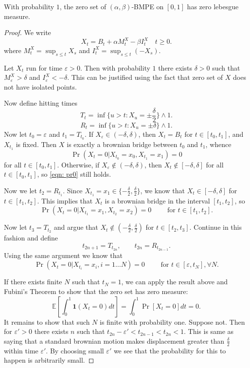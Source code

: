 \begin{proposition}
	With probability $1$, the zero set of $\left( \alpha, \beta \right) $-BMPE on $[0,1]$ has zero lebesgue measure.
\end{proposition}
\begin{proof}
	We write
	\[
		X_t=B_t+\alpha M_t^X-\beta I_t^X \quad t \geqslant 0
	.\] 
	where $M_t^X=\sup _{s \leqslant t} X_s$ and $I_t^X=\sup _{s \leqslant t}\left(-X_s\right)$. 

	Let  $X_t$ run for time  $\varepsilon>0$. Then with probability $1$ there exists $\delta>0$ such that $M_\varepsilon^X > \delta$ and $I_\varepsilon^X < - \delta$. This can be justified using the fact that zero set of $X$ does not have isolated points. 

	Now define hitting times
	\[
		T_t = \inf\{u>t: X_u = \pm \frac{\delta}{2} \} \wedge 1
	.\]
	\[
		R_t = \inf \{u>t: X_u = \pm \delta\} \wedge 1
	.\] 
	Now let $t_0 = \varepsilon $ and $t_1 = T_{t_0}$. If $X_\varepsilon \in \left( - \delta, \delta \right) $, then $X_t = B_t$ for $t \in [t_0, t_1]$, and $X_{t_1}$ is fixed. Then $X$ is exactly a brownian bridge between $t_0$ and $t_1$, whence
	\begin{equation}\label{eqn: pr0}
		\operatorname{Pr} (X_t=0 | X_{t_0} = x_0, X_{t_1} = x_1) =0
	\end{equation}
	for all $t \in [t_0, t_1]$. Otherwise, if $X_\varepsilon \not\in \left( -\delta, \delta \right) $, then $X_t \not\in [-\delta, \delta]$ for all $t \in [t_0,t_1]$, so \eqref{eqn: pr0} still holds.

	Now we let $t_2 = R_{t_1}$. Since $X_{t_1} = x_1 \in \{-\frac{\delta}{2}, \frac{\delta}{2}\} $, we know that $X_{t} \in \left[ -\delta, \delta \right] $ for $t \in [t_1, t_2]$. This implies that $X_t$ is a brownian bridge in the interval $[t_1, t_2]$, so 
	\[
		\operatorname{Pr} (X_t = 0|X_{t_1} = x_1, X_{t_2} = x_2) = 0 \qquad \text{ for }t \in [t_1,t_2]
	.\] 

	Now let $t_3 = T_{t_2}$ and argue that $X_t \not\in (-\frac{\delta}{2}, \frac{\delta}{2})$ for $t \in [t_2, t_3]$. Continue in this fashion and define
	\[
		t_{2n+1} = T_{t_{2n}}, \qquad t_{2n} = R_{t_{2n-1}}
	.\] 
	Using the same argument we know that 
	 \[
		 \operatorname{Pr} (X_t = 0|X_{t_i} = x_i, i = 1\ldots N) = 0 \qquad \text{ for } t \in [\varepsilon, t_N], \forall N
	.\] 
	
	If there exists finite $N$ such that $t_N = 1$, we can apply the result above and Fubini's Theorem to show that the zero set has zero measure:
	\[
		\mathbb{E}\left[ \int _0^1 \mathbf{1}(X_t = 0) dt \right] = \int _0^1 \operatorname{Pr} \left[ X_t = 0 \right] dt = 0 
	.\] 
	It remains to show that such $N$ is finite with probability one. Suppose not. Then for  $\varepsilon'>0$ there exists $n$ such that $t_{2n}- \varepsilon' < t_{2n-1} < t_{2n} < 1 $. This is same as saying that a standard brownian motion makes displacement greater than $\frac{\delta}{2}$ within time $\varepsilon'$. By choosing small $\varepsilon'$ we see that the probability for this to happen is arbitrarily small.
\end{proof}

